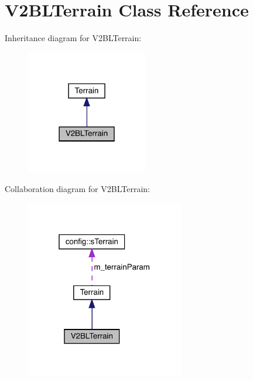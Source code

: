 \hypertarget{class_v2_b_l_terrain}{}\section{V2\+B\+L\+Terrain Class Reference}
\label{class_v2_b_l_terrain}


Inheritance diagram for V2\+B\+L\+Terrain\+:\nopagebreak
\begin{figure}[H]
\begin{center}
\leavevmode
\includegraphics[width=150pt]{class_v2_b_l_terrain__inherit__graph}
\end{center}
\end{figure}


Collaboration diagram for V2\+B\+L\+Terrain\+:\nopagebreak
\begin{figure}[H]
\begin{center}
\leavevmode
\includegraphics[width=196pt]{class_v2_b_l_terrain__coll__graph}
\end{center}
\end{figure}
